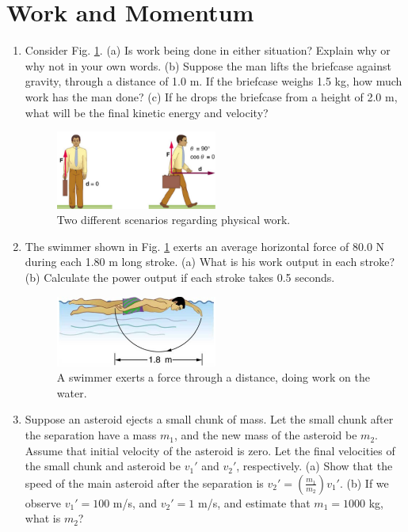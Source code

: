 \documentclass[10pt]{article}
\begin{document}
\section{Work and Momentum}
\begin{enumerate}
\item Consider Fig. \ref{fig:work}.  (a) Is work being done in either situation?  Explain why or why not in your own words. (b) Suppose the man lifts the briefcase against gravity, through a distance of 1.0 m.  If the briefcase weighs 1.5 kg, how much work has the man done? (c) If he drops the briefcase from a height of 2.0 m, what will be the final kinetic energy and velocity?
\begin{figure}[hb]
\centering
\includegraphics[width=0.5\textwidth]{figures/final1.png}
\caption{\label{fig:work} Two different scenarios regarding physical work.}
\end{figure}
\item The swimmer shown in Fig. \ref{fig:work} exerts an average horizontal force of 80.0 N during each 1.80 m long stroke. (a) What is his work output in each stroke? (b) Calculate the power output if each stroke takes 0.5 seconds.
\begin{figure}[hb]
\centering
\includegraphics[width=0.5\textwidth]{figures/swim.png}
\caption{\label{fig:power} A swimmer exerts a force through a distance, doing work on the water.}
\end{figure}
\item Suppose an asteroid ejects a small chunk of mass.  Let the small chunk after the separation have a mass $m_1$, and the new mass of the asteroid be $m_2$.  Assume that initial velocity of the asteroid is zero.  Let the final velocities of the small chunk and asteroid be $v_1'$ and $v_2'$, respectively. (a) Show that the speed of the main asteroid after the separation is $v_2' = \left(\frac{m_1}{m_2}\right) v_1'$. (b) If we observe $v_1' = 100$ m/s, and $v_2' = 1$ m/s, and estimate that $m_1 = 1000$ kg, what is $m_2$?
\end{enumerate}
\end{document}
